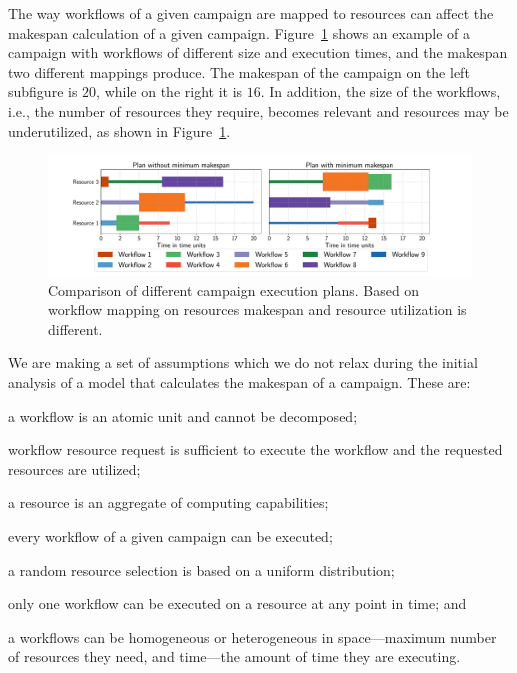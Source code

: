 The way workflows of a given campaign are mapped to resources can affect the makespan calculation of a given campaign. 
Figure~\ref{fig:example_makespan} shows an example of a campaign with workflows of different size and execution times, and the makespan two different mappings produce.
The makespan of the campaign on the left subfigure is $20$, while on the right it is $16$.
In addition, the size of the workflows, i.e., the number of resources they require, becomes relevant and resources may be underutilized, as shown in Figure~\ref{fig:example_makespan}.

\begin{figure}[ht!]
    \centering
    \includegraphics[width=.95\textwidth]{figures/random_vs_specific.pdf}
    \caption{Comparison of different campaign execution plans. Based on workflow mapping on resources makespan and resource utilization is different.}\label{fig:example_makespan}
\end{figure}

We are making a set of assumptions which we do not relax during the initial analysis of a model that calculates the makespan of a campaign.
These are:
\begin{inparaenum}[(1)]
    \item a workflow is an atomic unit and cannot be decomposed;
    \item workflow resource request is sufficient to execute the workflow and the requested resources are utilized;
    \item a resource is an aggregate of computing capabilities;
    \item every workflow of a given campaign can be executed;
    \item a random resource selection is based on a uniform distribution;
    \item only one workflow can be executed on a resource at any point in time; and
    \item a workflows can be homogeneous or heterogeneous in space---maximum number of resources they need, and time---the amount of time they are executing.
\end{inparaenum}

